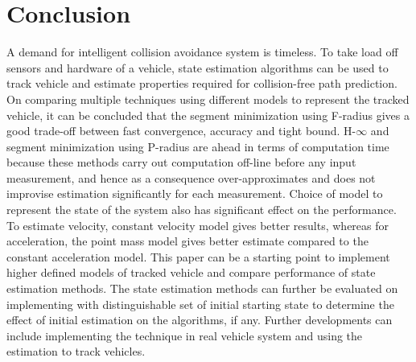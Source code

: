\chapter{Conclusion} \label{ch:conclusion}
A demand for intelligent collision avoidance system is timeless. To take load off sensors and hardware of a vehicle, state estimation algorithms can be used to track vehicle and estimate properties required for collision-free path prediction. On comparing multiple techniques using different models to represent the tracked vehicle, it can be concluded that the segment minimization using F-radius gives a good trade-off between fast convergence, accuracy and tight bound. H-$\infty$ and segment minimization using P-radius are ahead in terms of computation time because these methods carry out computation off-line before any input measurement, and hence as a consequence over-approximates and does not improvise estimation significantly for each measurement. Choice of model to represent the state of the system also has significant effect on the performance. To estimate velocity, constant velocity model gives better results, whereas for acceleration, the point mass model gives better estimate compared to the constant acceleration model. This paper can be a starting point to implement higher defined models of tracked vehicle and compare performance of state estimation methods. The state estimation methods can further be evaluated on implementing with distinguishable set of initial starting state to determine the effect of initial estimation on the algorithms, if any. Further developments can include implementing the technique in real vehicle system and using the estimation to track vehicles.